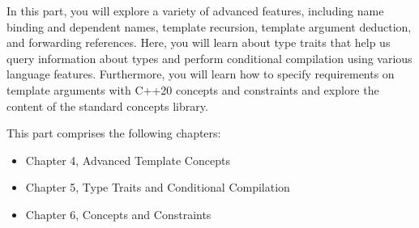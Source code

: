 In this part, you will explore a variety of advanced features, including name binding and dependent names, template recursion, template argument deduction, and forwarding references. Here, you will learn about type traits that help us query information about types and perform conditional compilation using various language features. Furthermore, you will learn how to specify requirements on template arguments with C++20 concepts and constraints and explore the content of the standard concepts library.

This part comprises the following chapters:

\begin{itemize}
\item
Chapter 4, Advanced Template Concepts

\item
Chapter 5, Type Traits and Conditional Compilation

\item
Chapter 6, Concepts and Constraints
\end{itemize}







